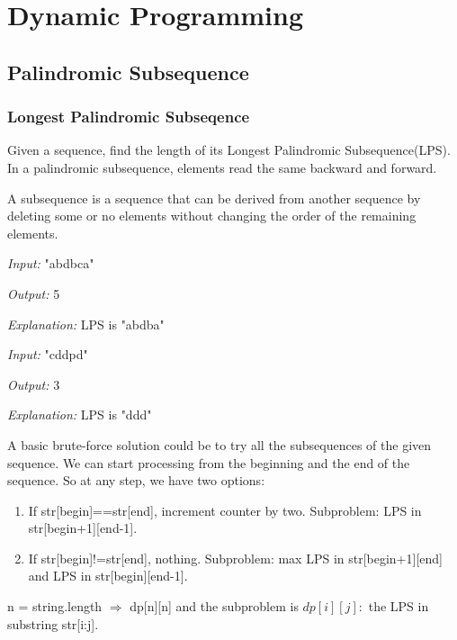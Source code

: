 \chapter{Dynamic Programming}


\section{Palindromic Subsequence}

\subsection{Longest Palindromic Subseqence}


Given a sequence, find the length of its Longest Palindromic Subsequence(LPS). 
In a palindromic subsequence, elements
read the same backward and forward.

A subsequence is a sequence that can be derived from another sequence by deleting some 
or no elements without changing the order of the remaining elements.


    \textit{Input:} "abdbca"
    
    \textit{Output:} 5
    
    \textit{Explanation:} LPS is "abdba"
    \newline

    \textit{Input:} "cddpd"
    
    \textit{Output:} 3
    
    \textit{Explanation:} LPS is "ddd"


A basic brute-force solution could be to try all the subsequences of the given sequence.
We can start processing from the beginning and the end of the sequence. So at any step, we have two options:

\begin{enumerate}
    \item If str[begin]==str[end], increment counter by two. Subproblem: LPS in str[begin+1][end-1].
    \item If str[begin]!=str[end], nothing. Subproblem: max LPS in str[begin+1][end] and LPS in str[begin][end-1].
\end{enumerate}



    n = string.length $\Rightarrow$ dp[n][n] and the subproblem is $dp[i][j]:$ the LPS in substring str[i:j].

